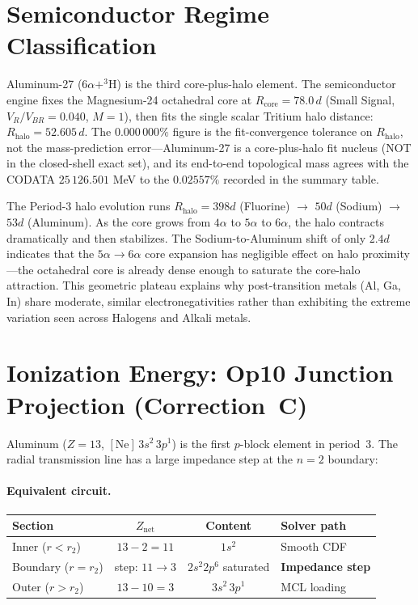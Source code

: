 \section{Semiconductor Regime Classification}
Aluminum-27 ($6\alpha + ^3\text{H}$) is the third core-plus-halo element. The semiconductor engine fixes the Magnesium-24 octahedral core at $R_{\text{core}} = 78.0\,d$ (Small Signal, $V_R/V_{BR} = 0.040$, $M = 1$), then fits the single scalar Tritium halo distance: $R_{\text{halo}} = 52.605\,d$. The $0.000\,000\%$ figure is the fit-convergence tolerance on $R_{\text{halo}}$, not the mass-prediction error---Aluminum-27 is a core-plus-halo fit nucleus (NOT in the closed-shell exact set), and its end-to-end topological mass agrees with the CODATA $25\,126.501$ MeV to the $0.02557\%$ recorded in the summary table.

The Period-3 halo evolution runs $R_{\text{halo}} = 398d$ (Fluorine) $\to$ $50d$ (Sodium) $\to$ $53d$ (Aluminum). As the core grows from $4\alpha$ to $5\alpha$ to $6\alpha$, the halo contracts dramatically and then stabilizes. The Sodium-to-Aluminum shift of only $2.4d$ indicates that the $5\alpha \to 6\alpha$ core expansion has negligible effect on halo proximity---the octahedral core is already dense enough to saturate the core-halo attraction. This geometric plateau explains why post-transition metals (Al, Ga, In) share moderate, similar electronegativities rather than exhibiting the extreme variation seen across Halogens and Alkali metals.

\section{Ionization Energy: Op10 Junction Projection (Correction~C)}
\label{sec:al_ie_correction_c}

Aluminum ($Z = 13$, $[\text{Ne}]\,3s^2\,3p^1$) is the first $p$-block element in period~3.  The radial transmission line has a large impedance step at the $n = 2$ boundary:

\paragraph{Equivalent circuit.}
\begin{center}
\small
\begin{tabularx}{\textwidth}{@{}lccX@{}}
\toprule
\textbf{Section} & \textbf{$Z_\text{net}$} & \textbf{Content} & \textbf{Solver path} \\
\midrule
Inner ($r < r_2$) & $13 - 2 = 11$ & $1s^2$ & Smooth CDF \\
Boundary ($r = r_2$) & step: $11 \to 3$ & $2s^2 2p^6$ saturated & \textbf{Impedance step} \\
Outer ($r > r_2$) & $13 - 10 = 3$ & $3s^2\,3p^1$ & MCL loading \\
\bottomrule
\end{tabularx}
\end{center}

